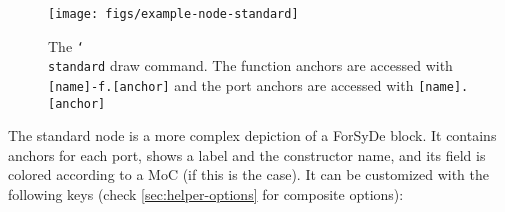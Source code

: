 \begin{figure}[htb]\centering
\texttt{[image: figs/example-node-standard]}

\caption{The \texttt{\char`\\standard} draw command. The function anchors are accessed with \texttt{[name]-f.[anchor]} and the port anchors are accessed with \texttt{[name].[anchor]}}
\end{figure}
\hspace{1pt}

\noindent The standard node is a more complex depiction of a ForSyDe block. It contains anchors for each port, shows a label and the constructor name, and its field is colored according to a MoC (if this is the case). It can be customized with the following keys (check \ref{sec:helper-options} for composite options):

